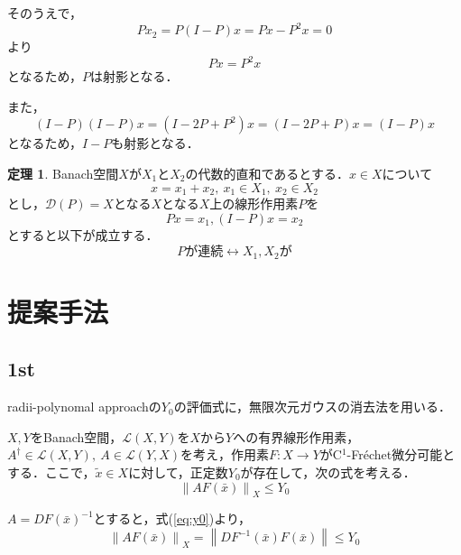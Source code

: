 \documentclass[11pt,a4paper]{jsarticle}
\theoremstyle{definition}
\newtheorem{thm}{定理}
\begin{document}
そのうえで，
\begin{equation*}
  Px_2 = P(I-P)x = Px - P^2x = 0
\end{equation*}
より
\begin{equation*}
  Px = P^2x
\end{equation*}
となるため，$P$は射影となる．

また，
\begin{equation*}
  (I-P)(I-P)x = (I-2P+P^2)x = (I - 2P + P)x = (I-P)x
\end{equation*}
となるため，$I-P$も射影となる．

\begin{thm}
  Banach空間$X$が$X_1$と$X_2$の代数的直和であるとする．$x \in X$について
  \begin{equation*}
    x = x_1 + x_2,\ x_1 \in X_1,\ x_2\in X_2
  \end{equation*}
  とし，$\mathcal{D}(P)=X$となる$X$となる$X$上の線形作用素$P$を
  \begin{equation*}
    Px = x_1, (I-P)x = x_2
  \end{equation*}
  とすると以下が成立する．
  \begin{equation*}
    Pが連続 \leftrightarrow X_1, X_2 が
  \end{equation*}
\end{thm}

\section{提案手法}

\subsection*{1st}

radii-polynomal approachの$Y_0$の評価式に，無限次元ガウスの消去法を用いる．

$X,Y$をBanach空間，$\mathcal{L}(X,Y)$を$X$から$Y$への有界線形作用素，$A^\dagger \in \mathcal{L}(X,Y),\ A \in \mathcal{L}(Y,X)$を考え，作用素$F:X \rightarrow Y$がC$^1$-Fr\'{e}chet微分可能とする．ここで，$\tilde{x}\in X$に対して，正定数$Y_0$が存在して，次の式を考える．
\begin{equation}
  \left\| AF(\bar{x}) \right\|_X \leq Y_0
  \label{eq:y0}
\end{equation}

$A=DF(\bar{x})^{-1}$とすると，式(\ref{eq:y0})より，
\begin{equation}
  \left\| AF(\bar{x}) \right\|_X = \left\| DF^{-1}(\bar{x}) F(\bar{x}) \right\| \leq Y_0
  \label{eq:y1}
\end{equation}
\end{document}
